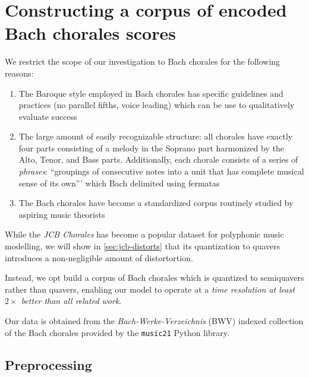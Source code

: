 \section{Constructing a corpus of encoded Bach chorales scores}


We restrict the scope of our investigation to Bach chorales for the following reasons:
\begin{enumerate}
  \item The Baroque style employed in Bach chorales has specific guidelines and
    practices \citep{piston1978harmony} (\eg no parallel fifths, voice leading)
    which can be use to qualitatively evaluate success
  \item The large amount of easily recognizable structure: all chorales have
    exactly four parts consisting of a melody in the Soprano part harmonized by
    the Alto, Tenor, and Bass parts. Additionally, each chorale consists of a
    series of \emph{phrases}: ``groupings of consecutive notes into a unit that
    has complete musical sense of its own'''\citep{nattiez1990music} which Bach
    delimited using fermatas
  \item The Bach chorales have become a standardized corpus routinely studied
    by aspiring music theorists\citep{white2002guidelines}
\end{enumerate}

While the \textit{JCB Chorales} \citep{Allan2005} has become a popular dataset
for polyphonic music modelling, we will show in \ref{sec:jcb-distorts} that its quantization to quavers
introduces a non-negligible amount of distortortion.

Instead, we opt build a corpus of Bach chorales which is quantized to
semiquavers rather than quavers, enabling our model to operate at a \emph{time
resolution at least $2\times$ better than all related work}.

Our data is obtained from the \emph{Bach-Werke-Verzeichnis} (BWV)
\citep{butt1999bach} indexed collection of the Bach chorales provided by the
\texttt{music21}\citep{Scott2015} Python library.

\subsection{Preprocessing}\label{sec:preprocessing}



